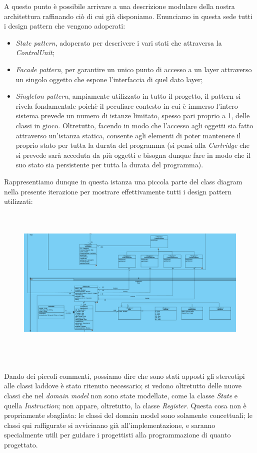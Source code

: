 \documentclass[11pt]{article}
\begin{document}
A questo punto è possibile arrivare a una descrizione modulare della nostra architettura raffinando ciò di cui già disponiamo. Enunciamo in questa sede tutti i design pattern che vengono adoperati:
\begin{itemize}
	\item{
		\emph{State pattern}, adoperato per descrivere i vari stati che attraversa la \emph{ControlUnit};
	}
	\item{
		\emph{Facade pattern}, per garantire un unico punto di accesso a un layer attraverso un singolo oggetto che espone l'interfaccia di quel dato layer;
	}
	\item{
		\emph{Singleton pattern}, ampiamente utilizzato in tutto il progetto, il pattern si rivela fondamentale poichè il peculiare contesto in cui è immerso l'intero sistema
		prevede un numero di istanze limitato, spesso pari proprio a 1, delle classi in gioco. Oltretutto, facendo in modo che l'accesso agli oggetti sia fatto attraverso
		un'istanza statica, consente agli elementi di poter mantenere il proprio stato per tutta la durata del programma (si pensi alla \emph{Cartridge} che si prevede sarà acceduta
		da più oggetti e bisogna dunque fare in modo che il suo stato sia persistente per tutta la durata del programma).
	}
	
\end{itemize}
Rappresentiamo dunque in questa istanza una piccola parte del class diagram nella presente iterazione per mostrare effettivamente tutti i design pattern utilizzati:
\begin{figure}[h]
\hspace*{-4.3cm}
\centering
\includegraphics[width=600px, height=277px]{CD_Emulator_0.png}
\end{figure}\\
Dando dei piccoli commenti, possiamo dire che sono stati apposti gli stereotipi alle classi laddove è stato ritenuto necessario; si vedono oltretutto delle nuove classi che nel \emph{domain model} non sono state modellate, come la classe \emph{State} e quella \emph{Instruction}; non appare, oltretutto, la classe \emph{Register}. Questa cosa non è propriamente sbagliata: le classi del domain model sono solamente concettuali; le classi qui raffigurate si avvicinano già all'implementazione, e saranno specialmente utili per guidare i progettisti alla programmazione di quanto progettato.\\
\end{document}
